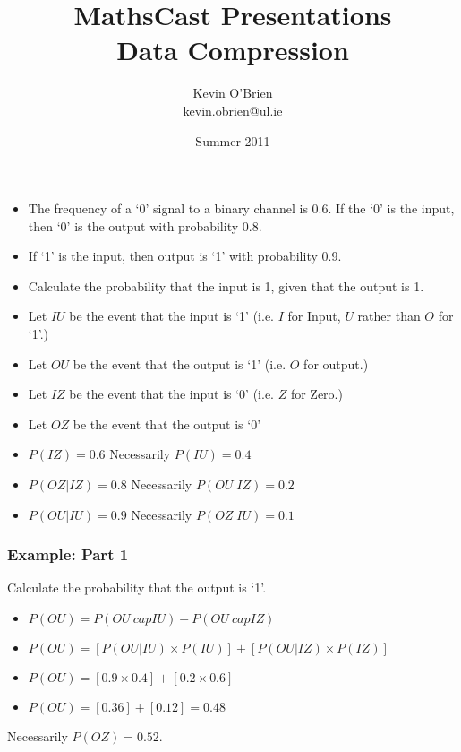 ﻿\documentclass[a4]{beamer}
\title[MathsCast]{MathsCast Presentations \\ {\normalsize Data Compression}}
\author[Kevin O'Brien]{Kevin O'Brien \\ {\scriptsize kevin.obrien@ul.ie}}
\date{Summer 2011}
\institute[Maths \& Stats]{Dept. of Mathematics \& Statistics, \\ University \textit{of} Limerick}
\begin{document}




\begin{frame}
\begin{itemize}
\item The frequency of a `0' signal to a binary channel is 0.6. If the `0' is the input, then `0' is the output with probability 0.8.

\item If `1' is the input, then output is `1' with probability 0.9.

\item Calculate the probability that the input is 1, given that the output is 1.
\end{itemize}

\end{frame}
\begin{frame}
\begin{itemize}
\item Let $IU$ be the event that the input is `1' (i.e. $I$ for Input, $U$ rather than $O$ for `1'.)
\item Let $OU$ be the event that the output is `1' (i.e. $O$ for output.)
\item Let $IZ$ be the event that the input is `0' (i.e. $Z$ for Zero.)
\item Let $OZ$ be the event that the output is `0'
\end{itemize}

\begin{itemize}
\item $P(IZ) = 0.6$  Necessarily $P(IU) = 0.4$
\item $P(OZ|IZ) = 0.8$  Necessarily $P(OU|IZ) = 0.2$
\item $P(OU|IU) = 0.9$  Necessarily $P(OZ|IU) = 0.1$
\end{itemize}
\end{frame}
\begin{frame}
\frametitle{Example: Part 1}
Calculate the probability that the output is `1'.
\begin{itemize}
\item $P(OU) = P(OU \ cap IU) + P(OU \ cap IZ)$

\item $P(OU) = [P(OU|IU) \times P(IU) ] + [P(OU|IZ) \times P(IZ) ]$

\item $P(OU) = [0.9 \times 0.4 ] + [0.2 \times 0.6 ]$

\item $P(OU) = [0.36] + [0.12] = \boldsymbol{0.48}$
\end{itemize}
Necessarily $P(OZ) = 0.52$.
\end{frame}
\end{document}
